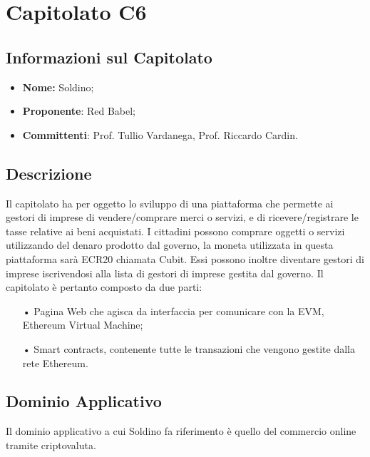 \section{Capitolato C6}
\subsection{Informazioni sul Capitolato}
\begin{itemize}
	\item \textbf{Nome:} Soldino;
	\item \textbf{Proponente}: Red Babel;
	\item \textbf{Committenti}: Prof. Tullio Vardanega, Prof. Riccardo Cardin.
\end{itemize}

\subsection{Descrizione}
Il capitolato ha per oggetto lo sviluppo di una piattaforma che permette ai gestori di imprese di \newline 
vendere/comprare merci o servizi, e di ricevere/registrare le tasse relative ai beni acquistati.\newline
I cittadini possono comprare oggetti o servizi utilizzando del denaro prodotto dal governo, la moneta utilizzata in questa piattaforma sarà ECR20 chiamata Cubit. Essi possono inoltre diventare gestori di imprese iscrivendosi alla lista di gestori di imprese gestita dal governo.  
Il capitolato è pertanto composto da due parti: 

\begin{itemize}

\item[•] Pagina Web che agisca da interfaccia per comunicare con la EVM, Ethereum Virtual Machine;
\item[•] Smart contracts, contenente tutte le transazioni che vengono gestite dalla rete Ethereum.

\end{itemize}

\subsection{Dominio Applicativo}
Il dominio applicativo a cui Soldino fa riferimento è quello del commercio online tramite criptovaluta. 

